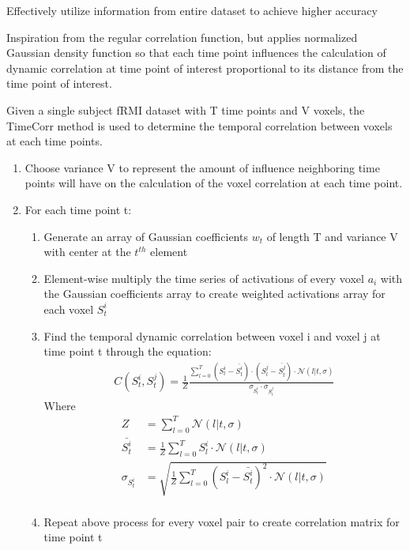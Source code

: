\documentclass[12pt]{article}
\begin{document}
Effectively utilize information from entire dataset to achieve higher accuracy

Inspiration from the regular correlation function, but applies normalized Gaussian density function so that each time point influences the calculation of dynamic correlation at time point of interest proportional to its distance from the time point of interest.

Given a single subject fRMI dataset with T time points and V voxels, the TimeCorr method is used to determine the temporal correlation between voxels at each time points. \\
\begin{enumerate}
\item Choose variance V to represent the amount of influence neighboring time points will have on the calculation of the voxel correlation at each time point.\\
\item For each time point t:
\begin{enumerate}
\item Generate an array of Gaussian coefficients $w_t$ of length T and variance V with center at the $t^{th}$ element\\
\item Element-wise multiply the time series of activations of every voxel $a_i$ with the Gaussian coefficients array to create weighted activations array for each voxel $S^i_t$\\
\item Find the temporal dynamic correlation between voxel i and voxel j at time point t through the equation:
\begin{align*}
C(S^i_t,S^j_t) = \frac{1}{Z}\frac{\sum_{l=0}^T (S_l^i - \bar{S^i_t})\cdot(S^j_l - \bar{S^j_t})\cdot \mathcal{N}(l|t,\sigma)}{\sigma_{S_t^i} \cdot \sigma_{S_t^j}}
\end{align*}
Where
\begin{align*}
Z &= \sum_{l=0}^T \mathcal{N}(l|t,\sigma)\\
\bar{S^i_t} &=\frac{1}{Z} \sum_{l=0}^T S^i_l \cdot \mathcal{N}(l|t,\sigma)\\
\sigma_{S_t^i} &=\sqrt{ \frac{1}{Z}\sum_{l=0}^T (S_l^i-\bar{S_t^i})^2 \cdot \mathcal{N}(l|t,\sigma)}\\
\end{align*}
\item Repeat above process for every voxel pair to create correlation matrix for time point t
\end{enumerate}
\end{enumerate}
\end{document}
